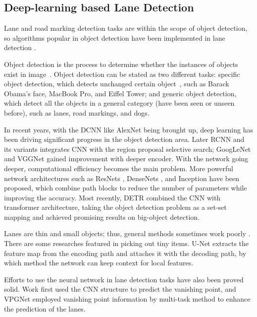 \begin{spacing}{1.5}
\subsection{Deep-learning based Lane Detection}

Lane and road marking detection tasks are within the scope of object detection, so algorithms popular in object detection have been implemented in lane detection \cite{tang2020review}. 

Object detection is the process to determine whether the instances of objects exist in image~\cite{liu2020deep}. Object detection can be stated as two different tasks: specific object detection, which detects unchanged certain object~\cite{zhang2013object}, such as Barack Obama’s face, MacBook Pro, and Eiffel Tower; and generic object detection, which detect all the objects in a general category (have been seen or unseen before), such as lanes, road markings, and dogs. 

In recent years, with the DCNN like AlexNet \cite{krizhevsky2012imagenet} being brought up, deep learning has been driving significant progress in the object detection area. Later RCNN and its variants \cite{girshick2014rich, girshick2015fast, ren2015faster} integrates CNN with the region proposal selective search; GoogLeNet \cite{szegedy2015going} and VGGNet \cite{simonyan2014very} gained improvement with deeper encoder. With the network going deeper, computational efficiency becomes the main problem. More powerful network architectures such as ResNets \cite{he2016deep}, DenseNets \cite{huang2017densely}, and Inception \cite{ioffe2015batch} have been proposed, which combine path blocks to reduce the number of parameters while improving the accuracy. Most recently, DETR \cite{carion2020end} combined the CNN with transformer architecture, taking the object detection problem as a set-set mapping and achieved promising results on big-object detection.

Lanes are thin and small objects; thus, general methods sometimes work poorly \cite{tang2020review}. There are some researches featured in picking out tiny items. U-Net \cite{ronneberger2015unet} extracts the feature map from the encoding path and attaches it with the decoding path, by which method the network can keep context for local features.

Efforts to use the neural network in lane detection tasks have also been proved solid. Work \cite{borji2016vanishing} first used the CNN structure to predict the vanishing point, and VPGNet \cite{lee2017vpgnet} employed vanishing point information by multi-task method to enhance the prediction of the lanes.


\end{spacing}
